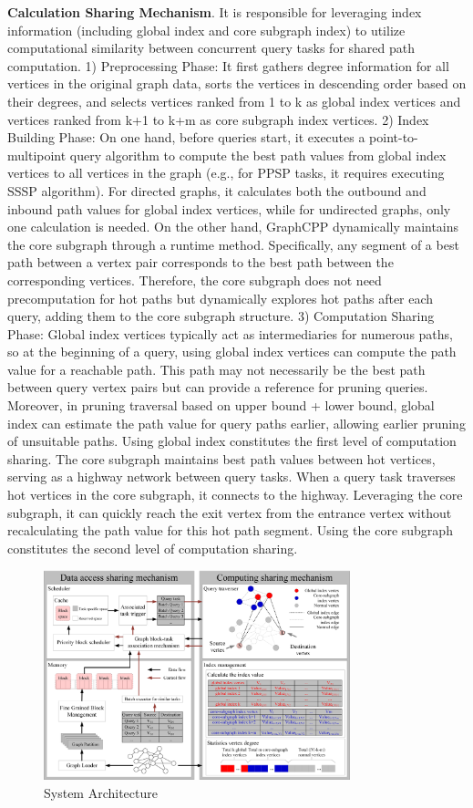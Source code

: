 \documentclass[lettersize,journal]{IEEEtran} %
\begin{document}
{\bf{Calculation Sharing Mechanism}}. It is responsible for leveraging index information (including global index and core subgraph index) to utilize computational similarity between concurrent query tasks for shared path computation. 1) Preprocessing Phase: It first gathers degree information for all vertices in the original graph data, sorts the vertices in descending order based on their degrees, and selects vertices ranked from 1 to k as global index vertices and vertices ranked from k+1 to k+m as core subgraph index vertices. 2) Index Building Phase: On one hand, before queries start, it executes a point-to-multipoint query algorithm to compute the best path values from global index vertices to all vertices in the graph (e.g., for PPSP tasks, it requires executing SSSP algorithm). For directed graphs, it calculates both the outbound and inbound path values for global index vertices, while for undirected graphs, only one calculation is needed. On the other hand, GraphCPP dynamically maintains the core subgraph through a runtime method. Specifically, any segment of a best path between a vertex pair corresponds to the best path between the corresponding vertices. Therefore, the core subgraph does not need precomputation for hot paths but dynamically explores hot paths after each query, adding them to the core subgraph structure. 3) Computation Sharing Phase: Global index vertices typically act as intermediaries for numerous paths, so at the beginning of a query, using global index vertices can compute the path value for a reachable path. This path may not necessarily be the best path between query vertex pairs but can provide a reference for pruning queries. Moreover, in pruning traversal based on upper bound + lower bound, global index can estimate the path value for query paths earlier, allowing earlier pruning of unsuitable paths. Using global index constitutes the first level of computation sharing. The core subgraph maintains best path values between hot vertices, serving as a highway network between query tasks. When a query task traverses hot vertices in the core subgraph, it connects to the highway. Leveraging the core subgraph, it can quickly reach the exit vertex from the entrance vertex without recalculating the path value for this hot path segment. Using the core subgraph constitutes the second level of computation sharing.

\begin{figure}[!t]
\centering
\includegraphics[width=3.5in]{系统架构}
\caption{System Architecture}  
\label{系统架构}
\end{figure}
 
\end{document}
